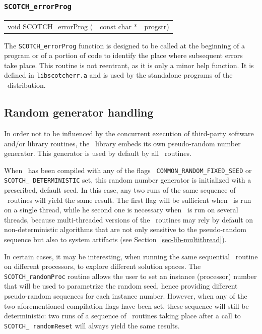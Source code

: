\subsubsection{{\tt SCOTCH\_errorProg}}

\begin{itemize}
\progsyn

{\tt\begin{tabular}{l@{}ll}
void SCOTCH\_errorProg ( & const char * & progstr)
\end{tabular}}

\progdes

The {\tt SCOTCH\_errorProg} function is designed to be called at
the beginning of a program or of a portion of code to identify the
place where subsequent errors take place.
This routine is not reentrant, as it is only a minor help function. It
is defined in {\tt lib\lbt scotch\lbt err.a} and is used by the
standalone programs of the \scotch\ distribution.
\end{itemize}

\subsection{Random generator handling}
\label{sec-lib-random}

In order not to be influenced by the concurrent execution of third-party
software and/or library routines, the \libscotch\ library embeds its
own pseudo-random number generator. This generator is used by default
by all \libscotch\ routines.

When \scotch\ has been compiled with any of the flags {\tt
COMMON\_\lbt RANDOM\_\lbt FIXED\_\lbt SEED} or {\tt SCOTCH\_\lbt
DETERMINISTIC} set, this random number generator is initialized with
a prescribed, default seed. In this case, any two runs of the same
sequence of \libscotch\ routines will yield the same result. The
first flag will be sufficient when \scotch\ is run on a single thread,
while he second one is necessary when \scotch\ is run on several
threads, because multi-threaded versions of the \libscotch\ routines
may rely by default on non-deterministic algorithms that are not only
sensitive to the pseudo-random sequence but also to system artifacts
(see Section~\ref{sec-lib-multithread}).

In certain cases, it may be interesting, when running the same
sequential \scotch\ routine on different processors, to explore
different solution spaces. The \texttt{SCOTCH\_\lbt random\lbt Proc}
routine allows the user to set an instance (processor) number that
will be used to parametrize the random seed, hence providing different
pseudo-random sequences for each instance number. However, when any of
the two aforementioned compilation flags have been set, these sequence
will still be deterministic: two runs of a sequence of
\libscotch\ routines taking place after a call to \texttt{SCOTCH\_\lbt
random\lbt Reset} will always yield the same results.

